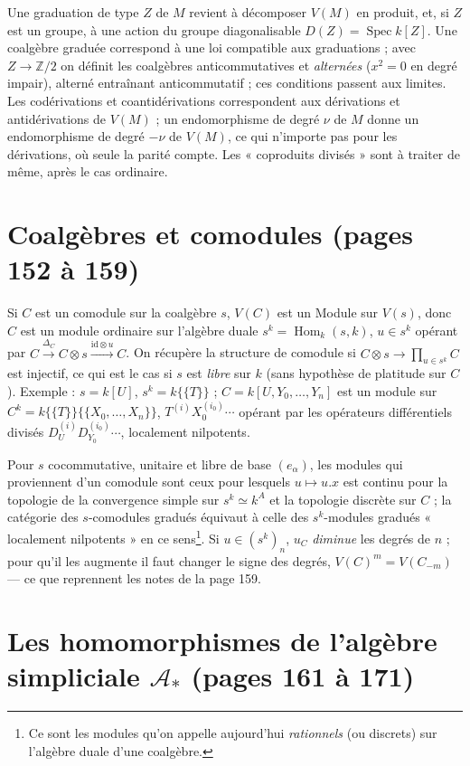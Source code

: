 \documentclass[11pt,a4paper]{article}
\begin{document}
Une graduation de type $Z$ de $M$ revient à décomposer $V(M)$ en produit, et,
si $Z$ est un groupe, à une action du groupe diagonalisable $D(Z) =
\operatorname{Spec} k[Z]$. Une coalgèbre graduée correspond à une loi
compatible aux graduations ; avec $Z \to \mathbb{Z}/2$ on définit les
coalgèbres anticommutatives et \emph{alternées} ($x^2 = 0$ en degré impair),
alterné entraînant anticommutatif ; ces conditions passent aux limites. Les
codérivations et coantidérivations correspondent aux dérivations et
antidérivations de $V(M)$ ; un endomorphisme de degré $\nu$ de $M$ donne un
endomorphisme de degré $-\nu$ de $V(M)$, ce qui n'importe pas pour les
dérivations, où seule la parité compte. Les « coproduits divisés » sont à
traiter de même, après le cas ordinaire.

\section*{Coalgèbres et comodules (pages 152 à 159)}

Si $C$ est un comodule sur la coalgèbre $s$, $V(C)$ est un Module sur $V(s)$,
donc $C$ est un module ordinaire sur l'algèbre duale $s^k =
\operatorname{Hom}_k(s, k)$, $u \in s^k$ opérant par $C \xrightarrow{\Delta_C}
C \otimes s \xrightarrow{\mathrm{id} \otimes u} C$. On récupère la structure de
comodule si $C \otimes s \to \prod_{u \in s^k} C$ est injectif, ce qui est le cas
si $s$ est \emph{libre} sur $k$ (sans hypothèse de platitude sur $C$).
Exemple : $s = k[U]$, $s^k = k\{\{T\}\}$ ; $C = k[U, Y_0,\ldots,Y_n]$ est un
module sur $C^k = k\{\{T\}\}\{\{X_0,\ldots,X_n\}\}$, $T^{(i)}X^{(i_0)}_0\cdots$
opérant par les opérateurs différentiels divisés $D_U^{(i)} D_{Y_0}^{(i_0)}
\cdots$, localement nilpotents.

Pour $s$ cocommutative, unitaire et libre de base $(e_\alpha)$, les modules qui
proviennent d'un comodule sont ceux pour lesquels $u \mapsto u.x$ est continu
pour la topologie de la convergence simple sur $s^k \simeq k^A$ et la topologie
discrète sur $C$ ; la catégorie des $s$-comodules gradués équivaut à celle des
$s^k$-modules gradués « localement nilpotents » en ce sens\footnote{Ce sont
les modules qu'on appelle aujourd'hui \emph{rationnels} (ou discrets) sur
l'algèbre duale d'une coalgèbre.}. Si $u \in (s^k)_n$, $u_C$ \emph{diminue} les
degrés de $n$ ; pour qu'il les augmente il faut changer le signe des degrés,
$V(C)^m = V(C_{-m})$ — ce que reprennent les notes de la page 159.

\section*{Les homomorphismes de l'algèbre simpliciale $\mathcal{A}_*$ (pages 161 à 171)}
\end{document}
